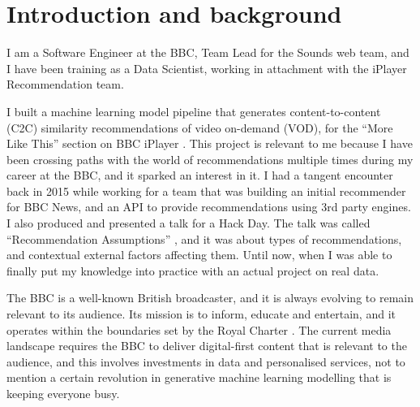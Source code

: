 
\section{Introduction and background}

I am a Software Engineer at the BBC, Team Lead for the Sounds web team, and I have been training as a Data Scientist,
working in attachment with the iPlayer Recommendation team.

I built a machine learning model pipeline that generates content-to-content (C2C) similarity recommendations
of video on-demand (VOD), for the ``More Like This'' section on BBC iPlayer \cite{BBC:MoreLikeBluey}.
This project is relevant to me because I have been crossing paths with the world of recommendations
multiple times during my career at the BBC, and it sparked an interest in it.
I had a tangent encounter back in 2015 while working for a team that was building
an initial recommender for BBC News, and an API to provide recommendations using 3rd party engines.
I also produced and presented a talk for a Hack Day. The talk was called ``Recommendation Assumptions'' \cite{RecsAssumptions},
and it was about types of recommendations, and contextual external factors affecting
them. Until now, when I was able to finally put my knowledge into practice
with an actual project on real data.

The BBC is a well-known British broadcaster, and it is always evolving to remain relevant to its audience. Its mission
is to inform, educate and entertain, and it operates within the boundaries set by the Royal Charter \cite{BBC:RoyalCharter}.
The current media landscape requires the BBC to deliver digital-first content that is relevant to the audience,
and this involves investments in data and personalised services, not to mention a certain revolution in
generative machine learning modelling that is keeping everyone busy.
